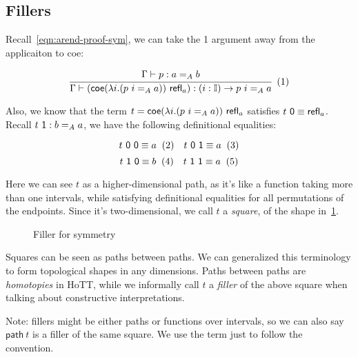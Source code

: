 

\subsection{Fillers}
\label{subsec:fill}

Recall~\ref{eqn:arend-proof-sym}, we can take the \textsf 1 argument away from
the applicaiton to \textsf{coe}:

\[
  \cfrac{
    \Gamma \vdash p : a =_A b
  }{
    \Gamma \vdash (\textsf{coe}
    (\lambda i. (p\ i =_A a)) \ \refl_a)
    : (i : \mathbb I) \rightarrow p\ i =_A a
  }
  \xtag \label{eqn:coe-a-b-path-gen-eta}
\]

Also, we know that the term $t = \textsf{coe} (\lambda i. (p\ i =_A a)) \ \textsf{refl}_a$
satisfies $t\ \textsf 0 \equiv \textsf{refl}_a$.
Recall $t\ \textsf 1 : b =_A a$,
we have the following definitional equalities:

\[
  t\ \textsf 0\ \textsf 0 \equiv a \xtag \quad
  t\ \textsf 0\ \textsf 1 \equiv a \xtag
\]
\[
  t\ \textsf 1\ \textsf 0 \equiv b \xtag \quad
  t\ \textsf 1\ \textsf 1 \equiv a \xtag
\]

Here we can see $t$ as a higher-dimensional path,
as it's like a function taking more than one intervals,
while satisfying definitional equalities for all permutations of the endpoints.
Since it's two-dimensional, we call $t$ a \textit{square},
of the shape in~\cref{fig:filler}.

\begin{figure}
\begin{center}
\end{center}
\caption{Filler for symmetry}
\label{fig:filler}
\end{figure}

Squares can be seen as paths between paths.
We can generalized this terminology to form topological shapes in any dimensions.
Paths between paths are \textit{homotopies} in HoTT,
while we informally call $t$ a \textit{filler} of the above square
when talking about constructive interpretations.

Note: fillers might be either paths or functions over intervals,
so we can also say $\textsf{path} \ t$ is a filler of the same square.
We use the term just to follow the convention.


